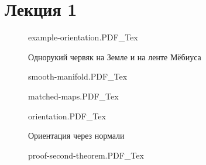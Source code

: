 \documentclass[12pt,a4paper]{article}
\newcommand{\incfig}[1]{%
    \def\svgwidth{\columnwidth}
    {#1.PDF_Tex}
}
\begin{document}
\section{Лекция 1}
\begin{figure}[ht]
    \centering
    \incfig{example-orientation}
    \caption{Однорукий червяк на Земле и на ленте Мёбиуса}
    \label{fig:example-orientation}
\end{figure}

\begin{figure}[ht]
    \centering
    \incfig{smooth-manifold}
    \label{fig:smooth-manifold}
\end{figure}

\begin{figure}[ht]
    \centering
    \incfig{matched-maps}
    \label{fig:matched-maps}
\end{figure}

\begin{figure}[ht]
    \centering
    \incfig{orientation}
    \caption{Ориентация через нормали}
    \label{fig:orientation}
\end{figure}

\begin{figure}[ht]
    \centering
    \incfig{proof-second-theorem}
    \label{fig:proof-second-theorem}
\end{figure}
	
\end{document}
